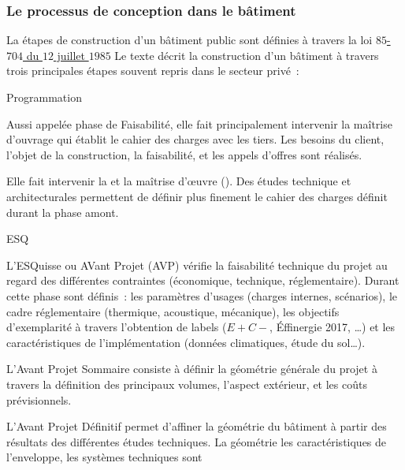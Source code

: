 \subsubsection{Le processus de conception dans le bâtiment} %
\label{ssub:le_processus_de_conception_dans_le_batiment}
La étapes de construction d’un bâtiment public sont définies à travers la loi
\href{https://www.legifrance.gouv.fr/affichTexte.do?cidTexte=JORFTEXT000000693683}{$85$-$704$ du $12$ juillet $1985$}
Le texte décrit la construction d’un bâtiment à travers trois principales étapes
souvent repris dans le secteur privé~:
\begin{blockdescription}{Programmation}
    \item[Programmation] Aussi appelée phase de Faisabilité, elle fait principalement intervenir la
          maîtrise d’ouvrage qui établit le cahier des charges avec les tiers. Les besoins
          du client, l’objet de la construction, la faisabilité, et les appels d’offres
          sont réalisés.
    \item[Conception] Elle fait intervenir la  et la maîtrise d’œuvre ().
          Des études technique et architecturales permettent de définir plus finement le cahier des charges
          définit durant la phase amont.
          \begin{blockdescription}{ESQ}
              \item [ESQ] L’ESQuisse ou AVant Projet (AVP) vérifie la faisabilité technique du projet au regard
                    des différentes contraintes (économique, technique, réglementaire). Durant cette
                    phase sont définis~: les paramètres d’usages
                    (charges internes, scénarios), le cadre réglementaire (thermique, acoustique, mécanique),
                    les objectifs d’exemplarité à travers l’obtention de labels ($E+C-$,
                     Éffinergie 2017, \dots) et les caractéristiques de l’implémentation
                    (données climatiques, étude du sol\dots).
              \item [APS] L’Avant Projet Sommaire consiste à définir la géométrie générale
                    du projet à travers la définition des principaux volumes, l’aspect extérieur,
                    et les coûts prévisionnels.
              \item [APD] L’Avant Projet Définitif permet d’affiner la géométrie du bâtiment
                    à partir des résultats des différentes études techniques. La géométrie
                    les caractéristiques de l’enveloppe, les systèmes techniques sont

\end{blockdescription}
\end{blockdescription}
